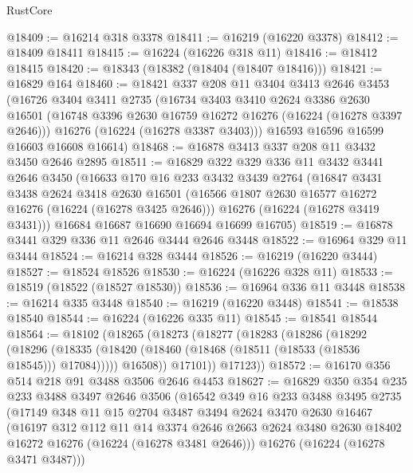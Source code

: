 \begin{lexlean}{RustCore}
\begin{coremodule}
@18409 := @16214 @318 @3378
@18411 := @16219 (@16220 @3378)
@18412 := @18409 @18411
@18415 := @16224 (@16226 @318 @11)
@18416 := @18412 @18415
@18420 := @18343 (@18382 (@18404 (@18407 @18416)))
@18421 := @16829 @164
@18460 := @18421
    @337
    @208
    @11
    @3404
    @3413
    @2646
    @3453
    (@16726
      @3404
      @3411
      @2735
      (@16734
        @3403
        @3410
        @2624
        @3386
        @2630
        @16501
        (@16748 @3396 @2630 @16759 @16272 @16276 (@16224 (@16278 @3397 @2646)))
        @16276
        (@16224 (@16278 @3387 @3403)))
      @16593
      @16596
      @16599
      @16603
      @16608
      @16614)
@18468 := @16878 @3413 @337 @208 @11 @3432 @3450 @2646 @2895
@18511 := @16829
    @322
    @329
    @336
    @11
    @3432
    @3441
    @2646
    @3450
    (@16633
      @170
      @16
      @233
      @3432
      @3439
      @2764
      (@16847
        @3431
        @3438
        @2624
        @3418
        @2630
        @16501
        (@16566 @1807 @2630 @16577 @16272 @16276 (@16224 (@16278 @3425 @2646)))
        @16276
        (@16224 (@16278 @3419 @3431)))
      @16684
      @16687
      @16690
      @16694
      @16699
      @16705)
@18519 := @16878 @3441 @329 @336 @11 @2646 @3444 @2646 @3448
@18522 := @16964 @329 @11 @3444
@18524 := @16214 @328 @3444
@18526 := @16219 (@16220 @3444)
@18527 := @18524 @18526
@18530 := @16224 (@16226 @328 @11)
@18533 := @18519 (@18522 (@18527 @18530))
@18536 := @16964 @336 @11 @3448
@18538 := @16214 @335 @3448
@18540 := @16219 (@16220 @3448)
@18541 := @18538 @18540
@18544 := @16224 (@16226 @335 @11)
@18545 := @18541 @18544
@18564 := @18102
    (@18265
      (@18273
        (@18277
          (@18283
            (@18286
              (@18292
                (@18296
                  (@18335 (@18420 (@18460 (@18468 (@18511 (@18533 (@18536 @18545))) @17084)))))
                @16508))
            @17101))
        @17123))
@18572 := @16170 @356 @514 @218 @91 @3488 @3506 @2646 @4453
@18627 := @16829
    @350
    @354
    @235
    @233
    @3488
    @3497
    @2646
    @3506
    (@16542
      @349
      @16
      @233
      @3488
      @3495
      @2735
      (@17149
        @348
        @11
        @15
        @2704
        @3487
        @3494
        @2624
        @3470
        @2630
        @16467
        (@16197
          @312
          @112
          @11
          @14
          @3374
          @2646
          @2663
          @2624
          @3480
          @2630
          @18402
          @16272
          @16276
          (@16224 (@16278 @3481 @2646)))
        @16276
        (@16224 (@16278 @3471 @3487)))

\end{coremodule}
\end{lexlean}
